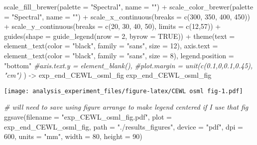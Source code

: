 \documentclass[
]{article}
\newenvironment{Shaded}{\begin{snugshade}}{\end{snugshade}}
\newcommand{\AttributeTok}[1]{\textcolor[rgb]{0.77,0.63,0.00}{#1}}
\newcommand{\CommentTok}[1]{\textcolor[rgb]{0.56,0.35,0.01}{\textit{#1}}}
\newcommand{\ConstantTok}[1]{\textcolor[rgb]{0.00,0.00,0.00}{#1}}
\newcommand{\DecValTok}[1]{\textcolor[rgb]{0.00,0.00,0.81}{#1}}
\newcommand{\FunctionTok}[1]{\textcolor[rgb]{0.00,0.00,0.00}{#1}}
\newcommand{\NormalTok}[1]{#1}
\newcommand{\OtherTok}[1]{\textcolor[rgb]{0.56,0.35,0.01}{#1}}
\newcommand{\SpecialCharTok}[1]{\textcolor[rgb]{0.00,0.00,0.00}{#1}}
\newcommand{\StringTok}[1]{\textcolor[rgb]{0.31,0.60,0.02}{#1}}
\begin{document}
\begin{Shaded}
\begin{Highlighting}[]
  \FunctionTok{scale\_fill\_brewer}\NormalTok{(}\AttributeTok{palette =} \StringTok{"Spectral"}\NormalTok{, }\AttributeTok{name =} \StringTok{""}\NormalTok{) }\SpecialCharTok{+}
  \FunctionTok{scale\_color\_brewer}\NormalTok{(}\AttributeTok{palette =} \StringTok{"Spectral"}\NormalTok{, }\AttributeTok{name =} \StringTok{""}\NormalTok{) }\SpecialCharTok{+}
  \FunctionTok{scale\_x\_continuous}\NormalTok{(}\AttributeTok{breaks =} \FunctionTok{c}\NormalTok{(}\DecValTok{300}\NormalTok{, }\DecValTok{350}\NormalTok{, }\DecValTok{400}\NormalTok{, }\DecValTok{450}\NormalTok{)) }\SpecialCharTok{+}
  \FunctionTok{scale\_y\_continuous}\NormalTok{(}\AttributeTok{breaks =} \FunctionTok{c}\NormalTok{(}\DecValTok{20}\NormalTok{, }\DecValTok{30}\NormalTok{, }\DecValTok{40}\NormalTok{, }\DecValTok{50}\NormalTok{),}
                     \AttributeTok{limits =} \FunctionTok{c}\NormalTok{(}\DecValTok{12}\NormalTok{,}\DecValTok{57}\NormalTok{)) }\SpecialCharTok{+}
  \FunctionTok{guides}\NormalTok{(}\AttributeTok{shape =} \FunctionTok{guide\_legend}\NormalTok{(}\AttributeTok{nrow =} \DecValTok{2}\NormalTok{, }\AttributeTok{byrow =} \ConstantTok{TRUE}\NormalTok{)) }\SpecialCharTok{+}
  \FunctionTok{theme}\NormalTok{(}\AttributeTok{text =} \FunctionTok{element\_text}\NormalTok{(}\AttributeTok{color =} \StringTok{"black"}\NormalTok{, }
                            \AttributeTok{family =} \StringTok{"sans"}\NormalTok{, }
                            \AttributeTok{size =} \DecValTok{12}\NormalTok{),}
        \AttributeTok{axis.text =} \FunctionTok{element\_text}\NormalTok{(}\AttributeTok{color =} \StringTok{"black"}\NormalTok{, }
                                 \AttributeTok{family =} \StringTok{"sans"}\NormalTok{, }
                                 \AttributeTok{size =} \DecValTok{8}\NormalTok{),}
        \AttributeTok{legend.position =} \StringTok{"bottom"}
        \CommentTok{\#axis.text.y = element\_blank(),}
        \CommentTok{\#plot.margin = unit(c(0.1,0,0.1,0.45), "cm")}
\NormalTok{        ) }\OtherTok{{-}\textgreater{}}\NormalTok{ exp\_end\_CEWL\_osml\_fig}
\NormalTok{exp\_end\_CEWL\_osml\_fig}
\end{Highlighting}
\end{Shaded}

\texttt{[image: analysis\_experiment\_files/figure-latex/CEWL osml fig-1.pdf]}

\begin{Shaded}
\begin{Highlighting}[]
\CommentTok{\# will need to save using figure arrange to make legend centered if I use that fig}
\FunctionTok{ggsave}\NormalTok{(}\AttributeTok{filename =} \StringTok{"exp\_CEWL\_osml\_fig.pdf"}\NormalTok{,}
       \AttributeTok{plot =}\NormalTok{ exp\_end\_CEWL\_osml\_fig,}
       \AttributeTok{path =} \StringTok{"./results\_figures"}\NormalTok{,}
       \AttributeTok{device =} \StringTok{"pdf"}\NormalTok{,}
       \AttributeTok{dpi =} \DecValTok{600}\NormalTok{,}
       \AttributeTok{units =} \StringTok{"mm"}\NormalTok{,}
       \AttributeTok{width =} \DecValTok{80}\NormalTok{, }\AttributeTok{height =} \DecValTok{90}\NormalTok{)}
\end{Highlighting}
\end{Shaded}
\end{document}
